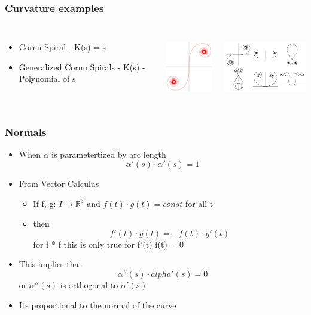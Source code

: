 \documentclass[10pt]{beamer}
\begin{document}
\begin{frame}
  \frametitle{Curvature examples}
  \begin{columns}
    \column{7cm}
    \begin{itemize}
    \item Cornu Spiral - K(s) = s
    \item Generalized Cornu Spirals - K(s) - Polynomial of s
    \end{itemize}
    \column{4cm}
    \centerline{\includegraphics[height=3cm]{CornuSpiral}}
    \centerline{\includegraphics[height=3cm]{CornuPolynomialSpirals}}
  \end{columns}
\end{frame}

\begin{frame}
  \frametitle{Normals}
  \begin{itemize}
  \item When $\alpha$ is parametertized by arc length
    \[
      \alpha'(s) \cdot \alpha'(s) = 1
    \]
  \item From Vector Calculus
    \begin{itemize}
    \item If f, g: $I \rightarrow \mathbb{R}^3$ and $f(t) \cdot  g(t) = const$ for all t
    \item then
      \[ f'(t) \cdot g(t) = -f(t) \cdot g'(t) \] for f * f this is only true for f'(t) f(t) = 0
    \end{itemize}
  \item This implies that
    \[ \alpha''(s) \cdot  alpha'(s) = 0 \]
    or $\alpha''(s)$ is orthogonal to $\alpha'(s)$
  \item Its proportional to the normal of the curve
  \end{itemize}
\end{frame}
\end{document}
